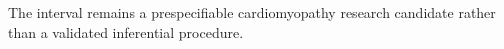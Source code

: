 The interval remains a prespecifiable cardiomyopathy research candidate rather than a validated inferential procedure.